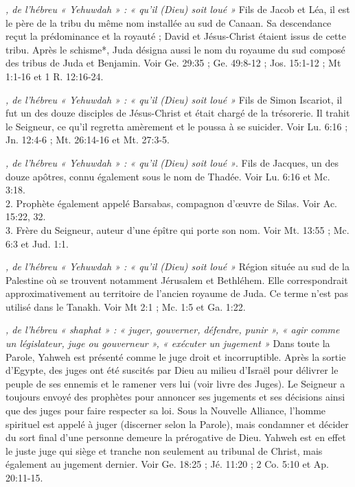 \begin{multicols}{2}
{\textit{, de l'hébreu « Yehuwdah » : « qu'il (Dieu) soit loué »}\newline
Fils de Jacob et Léa, il est le père de la tribu du même nom installée au sud de Canaan. Sa descendance reçut la prédominance et la royauté ; David et Jésus-Christ étaient issus de cette tribu. Après le schisme*, Juda désigna aussi le nom du royaume du sud composé des tribus de Juda et Benjamin. Voir Ge. 29:35 ; Ge. 49:8-12 ; Jos. 15:1-12 ; Mt 1:1-16 et 1 R. 12:16-24.

\textit{, de l'hébreu « Yehuwdah » : « qu'il (Dieu) soit loué »}\newline
Fils de Simon Iscariot, il fut un des douze disciples de Jésus-Christ et était chargé de la trésorerie. Il trahit le Seigneur, ce qu'il regretta amèrement et le poussa à se suicider. Voir Lu. 6:16 ; Jn. 12:4-6 ; Mt. 26:14-16 et Mt. 27:3-5.

\textit{, de l'hébreu « Yehuwdah » : « qu'il (Dieu) soit loué »}. Fils de Jacques, un des douze apôtres, connu également sous le nom de Thadée. Voir Lu. 6:16 et Mc. 3:18.
\\2. Prophète également appelé Barsabas, compagnon d'œuvre de Silas. Voir Ac. 15:22, 32.
\\3. Frère du Seigneur, auteur d'une épître qui porte son nom. Voir Mt. 13:55 ; Mc. 6:3 et Jud. 1:1.

\textit{, de l'hébreu « Yehuwdah » : « qu'il (Dieu) soit loué »}\newline
Région située au sud de la Palestine où se trouvent notamment Jérusalem et Bethléhem. Elle correspondrait approximativement au territoire de l'ancien royaume de Juda. Ce terme n'est pas utilisé dans le Tanakh. Voir Mt 2:1 ; Mc. 1:5 et Ga. 1:22.

\textit{, de l'hébreu « shaphat » : « juger, gouverner, défendre, punir », « agir comme un législateur, juge ou gouverneur », « exécuter un jugement »}\newline
Dans toute la Parole, Yahweh est présenté comme le juge droit et incorruptible. Après la sortie d'Egypte, des juges ont été suscités par Dieu au milieu d'Israël pour délivrer le peuple de ses ennemis et le ramener vers lui (voir livre des Juges). Le Seigneur a toujours envoyé des prophètes pour annoncer ses jugements et ses décisions ainsi que des juges pour faire respecter sa loi. Sous la Nouvelle Alliance, l'homme spirituel est appelé à juger (discerner selon la Parole), mais condamner et décider du sort final d'une personne demeure la prérogative de Dieu. Yahweh est en effet le juste juge qui siège et tranche non seulement au tribunal de Christ, mais également au jugement dernier. Voir Ge. 18:25 ; Jé. 11:20 ; 2 Co. 5:10 et Ap. 20:11-15.

}
\end{multicols}

